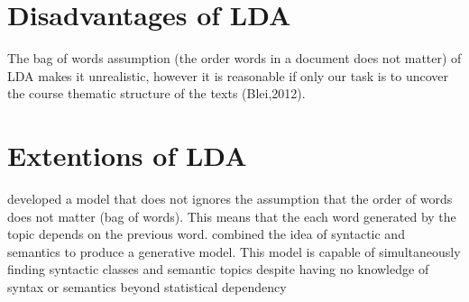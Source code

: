 \section{Disadvantages of LDA}
The bag of words assumption (the order words in a document does not matter) of LDA makes it unrealistic, however it is reasonable if only our task is to uncover the course thematic structure of the texts (Blei,2012).
\section{Extentions of LDA}
\cite{wallach2006topic} developed a model that does not ignores the assumption that the order of words does not matter (bag of words). This means that the each word generated by the topic depends on the previous word. 
\cite{griffiths2007topics} combined the idea of syntactic and semantics to produce a generative model. This model  is capable of simultaneously finding syntactic classes and semantic topics despite having no knowledge of syntax or semantics beyond statistical dependency
%
%
%
